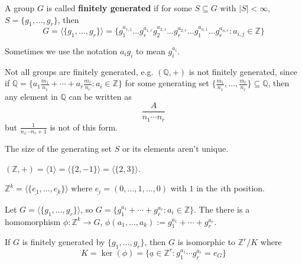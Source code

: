 \begin{definition}
	A group $G$ is called \textbf{finitely generated} if for some $S \subseteq G$ with $|S| < \infty$, $S = \{ g_1, \dots, g_r \}$, then
	\[
		G = \langle \{ g_1, \dots, g_r \} \rangle = \{ g_1^{a_{1, 1}} \dots g_r^{a_{1, r}} g_2^{a_{2, 1}} \dots g_r^{a_{2, r}} \dots g_1^{a_{n, 1}} \dots g_r^{a_{n, r}}: a_{i, j} \in \mathbb{Z} \}
	\]
\end{definition}

\begin{remark}
	Sometimes we use the notation $a_i g_i$ to mean $g_i^{a_i}$.
\end{remark}

\begin{remark}
	Not all groups are finitely generated, e.g. $(\mathbb{Q}, +)$ is not finitely generated, since if $\mathbb{Q} = \{ a_1 \frac{m_1}{n_1} + \cdots + a_r \frac{m_r}{n_r}: a_i \in \mathbb{Z} \}$ for some generating set $\{ \frac{m_1}{n_1}, \dots, \frac{m_r}{n_r} \} \subseteq \mathbb{Q}$, then any element in $\mathbb{Q}$ can be written as
	\[
		\frac{A}{n_1 \cdots n_r}
	\]
	but $\frac{1}{n_1 \cdots n_r + 1}$ is not of this form.
\end{remark}

\begin{example}
	The size of the generating set $S$ or its elements aren't unique.
\end{example}

\begin{example}
	$(\mathbb{Z}, +) = \langle 1 \rangle = \langle \{ 2, -1 \} \rangle = \langle \{ 2, 3 \} \rangle$.
\end{example}

\begin{example}
	$\mathbb{Z}^k = \langle \{ \underline{e_1}, \dots, \underline{e_k} \} \rangle$ where $\underline{e_i} = (0, \dots, 1, \dots, 0)$ with $1$ in the $i$th position.
\end{example}

\begin{example}
	Let $G = \langle \{ g_1, \dots, g_r \} \rangle$, so $G = \{ g_1^{a_1} + \cdots + g_r^{a_r}: a_i \in \mathbb{Z} \}$. The there is a homomorphism $\phi: \mathbb{Z}^k \to G$, $\phi(a_1, \dots, a_k) := g_1^{a_1} + \cdots + g_r^{a_r}$.
\end{example}

\begin{proposition}
	If $G$ is finitely generated by $\{ g_1, \dots, g_r \}$, then $G$ is isomorphic to $\mathbb{Z}^r / K$ where
	\[
		K = \ker(\phi) = \{ \underline{a} \in \mathbb{Z}^r: g_1^{a_1} \cdots g_r^{a_r} = e_G \}
	\]
\end{proposition}

